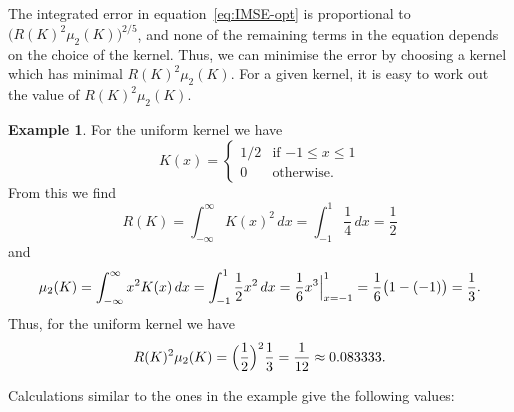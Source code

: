 \documentclass[
  a4paper,
]{article}
\theoremstyle{definition}
\theoremstyle{definition}
\newtheorem{example}{Example}[section]
\theoremstyle{definition}
\theoremstyle{definition}
\theoremstyle{remark}
\begin{document}
The integrated error in equation~\eqref{eq:IMSE-opt} is proportional to
\(\bigl( R(K)^2 \mu_2(K) \bigr)^{2/5}\), and none of the remaining terms in
the equation depends on the choice of the kernel. Thus, we can minimise
the error by choosing a kernel which has minimal \(R(K)^2 \mu_2(K)\).
For a given kernel, it is easy to work out the value of \(R(K)^2 \mu_2(K)\).

\begin{example}
For the uniform kernel we have
\begin{equation*}
  K(x)
  = \begin{cases}
      1/2 & \mbox{if $-1 \leq x \leq 1$} \\
      0 & \mbox{otherwise.}
    \end{cases}
\end{equation*}
From this we find
\begin{equation*}
  R(K)
  = \int_{-\infty}^\infty K(x)^2 \,dx
  = \int_{-1}^1 \frac14 \,dx
  = \frac12
\end{equation*}
and
\begin{equation*}
  \mu_2(K)
  = \int_{-\infty}^\infty x^2 K(x) \,dx
  = \int_{-1}^1 \frac12 x^2 \,dx
  = \frac16 \Bigl. x^3 \Bigr|_{x=-1}^1
  = \frac16 \bigl( 1 - (-1) \bigr)
  = \frac13.
\end{equation*}
Thus, for the uniform kernel we have
\begin{equation*}
  R(K)^2 \mu_2(K)
  = \Bigl( \frac12 \Bigr)^2 \frac13
  = \frac{1}{12}
  \approx 0.083333.
\end{equation*}
\end{example}

Calculations similar to the ones in the example give the following
values:
\end{document}
